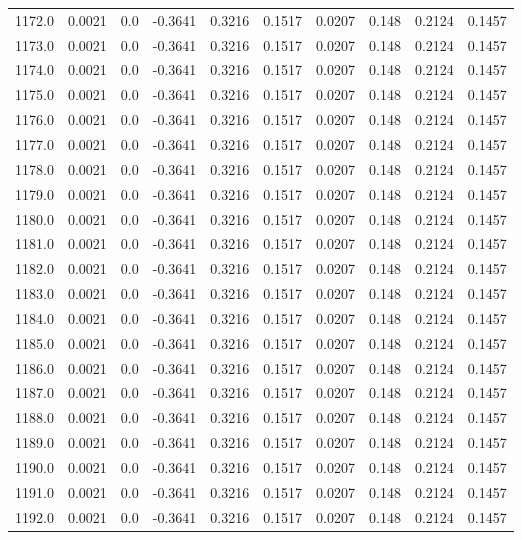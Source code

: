 \begin{longtable}{lrrrrrrrrr}
1172.0 & 0.0021 & 0.0 & -0.3641 & 0.3216 & 0.1517 & 0.0207 & 0.148 & 0.2124 & 0.1457 \\
1173.0 & 0.0021 & 0.0 & -0.3641 & 0.3216 & 0.1517 & 0.0207 & 0.148 & 0.2124 & 0.1457 \\
1174.0 & 0.0021 & 0.0 & -0.3641 & 0.3216 & 0.1517 & 0.0207 & 0.148 & 0.2124 & 0.1457 \\
1175.0 & 0.0021 & 0.0 & -0.3641 & 0.3216 & 0.1517 & 0.0207 & 0.148 & 0.2124 & 0.1457 \\
1176.0 & 0.0021 & 0.0 & -0.3641 & 0.3216 & 0.1517 & 0.0207 & 0.148 & 0.2124 & 0.1457 \\
1177.0 & 0.0021 & 0.0 & -0.3641 & 0.3216 & 0.1517 & 0.0207 & 0.148 & 0.2124 & 0.1457 \\
1178.0 & 0.0021 & 0.0 & -0.3641 & 0.3216 & 0.1517 & 0.0207 & 0.148 & 0.2124 & 0.1457 \\
1179.0 & 0.0021 & 0.0 & -0.3641 & 0.3216 & 0.1517 & 0.0207 & 0.148 & 0.2124 & 0.1457 \\
1180.0 & 0.0021 & 0.0 & -0.3641 & 0.3216 & 0.1517 & 0.0207 & 0.148 & 0.2124 & 0.1457 \\
1181.0 & 0.0021 & 0.0 & -0.3641 & 0.3216 & 0.1517 & 0.0207 & 0.148 & 0.2124 & 0.1457 \\
1182.0 & 0.0021 & 0.0 & -0.3641 & 0.3216 & 0.1517 & 0.0207 & 0.148 & 0.2124 & 0.1457 \\
1183.0 & 0.0021 & 0.0 & -0.3641 & 0.3216 & 0.1517 & 0.0207 & 0.148 & 0.2124 & 0.1457 \\
1184.0 & 0.0021 & 0.0 & -0.3641 & 0.3216 & 0.1517 & 0.0207 & 0.148 & 0.2124 & 0.1457 \\
1185.0 & 0.0021 & 0.0 & -0.3641 & 0.3216 & 0.1517 & 0.0207 & 0.148 & 0.2124 & 0.1457 \\
1186.0 & 0.0021 & 0.0 & -0.3641 & 0.3216 & 0.1517 & 0.0207 & 0.148 & 0.2124 & 0.1457 \\
1187.0 & 0.0021 & 0.0 & -0.3641 & 0.3216 & 0.1517 & 0.0207 & 0.148 & 0.2124 & 0.1457 \\
1188.0 & 0.0021 & 0.0 & -0.3641 & 0.3216 & 0.1517 & 0.0207 & 0.148 & 0.2124 & 0.1457 \\
1189.0 & 0.0021 & 0.0 & -0.3641 & 0.3216 & 0.1517 & 0.0207 & 0.148 & 0.2124 & 0.1457 \\
1190.0 & 0.0021 & 0.0 & -0.3641 & 0.3216 & 0.1517 & 0.0207 & 0.148 & 0.2124 & 0.1457 \\
1191.0 & 0.0021 & 0.0 & -0.3641 & 0.3216 & 0.1517 & 0.0207 & 0.148 & 0.2124 & 0.1457 \\
1192.0 & 0.0021 & 0.0 & -0.3641 & 0.3216 & 0.1517 & 0.0207 & 0.148 & 0.2124 & 0.1457 \\

\end{longtable}
